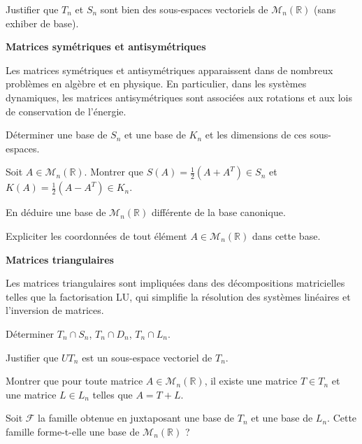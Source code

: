 \documentclass[10pt,a4paper]{article}
\begin{document}
\q Justifier que $T_n$ et $S_n$ sont bien des sous-espaces vectoriels de $\mathcal{M}_n(\mathbb{R})$
(sans exhiber de base).

\bigskip
\textbf{Matrices symétriques et antisymétriques}

Les matrices symétriques et antisymétriques apparaissent dans de nombreux problèmes en algèbre et en
physique. En particulier, dans les systèmes dynamiques, les matrices antisymétriques sont associées
aux rotations et aux lois de conservation de l'énergie.

\q Déterminer une base de $S_n$ et une base de $K_n$ et les dimensions de ces sous-espaces.

\q Soit $A \in \mathcal{M}_n(\mathbb{R})$. Montrer que $S(A) = \frac{1}{2}(A + A^T) \in S_n$ et
$K(A) = \frac{1}{2}(A - A^T) \in K_n$.

\q En déduire une base de $\mathcal{M}_n(\mathbb{R})$ différente de la base canonique.

\q Expliciter les coordonnées de tout élément $A \in \mathcal{M}_n(\mathbb{R})$ dans cette base.

\bigskip
\textbf{Matrices triangulaires}

Les matrices triangulaires sont impliquées dans des décompositions matricielles telles que la
factorisation LU, qui simplifie la résolution des systèmes linéaires et l'inversion de matrices.

\q Déterminer $T_n \cap S_n$, $T_n \cap D_n$, $T_n \cap L_n$.

\q Justifier que $UT_n$ est un sous-espace vectoriel de $T_n$.

\q Montrer que pour toute matrice $A \in \mathcal{M}_n(\mathbb{R})$, il existe une matrice $T
\in T_n$ et une matrice $L \in L_n$ telles que $A = T + L$.

\q Soit $\mathcal{F}$ la famille obtenue en juxtaposant une base de $T_n$ et une base de $L_n$.
Cette famille forme-t-elle une base de $\mathcal{M}_n(\mathbb{R})$ ?
\end{document}
